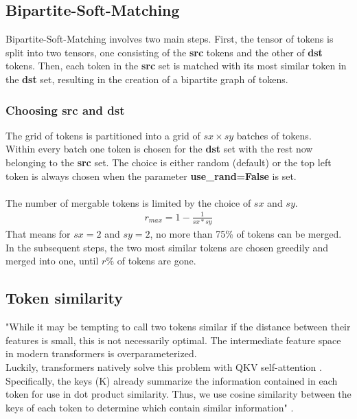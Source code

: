 \subsection{Bipartite-Soft-Matching}
Bipartite-Soft-Matching involves two main steps. First, the tensor of tokens is split into two tensors, one consisting of the \textbf{src} tokens and the other of \textbf{dst} tokens. Then, each token in the \textbf{src} set is matched with its most similar token in the \textbf{dst} set, resulting in the creation of a bipartite graph of tokens. 

\subsubsection*{Choosing src and dst}
The grid of tokens is partitioned into a grid of \(sx \times sy\) batches of tokens.\\
Within every batch one token is chosen for the \textbf{dst} set with the rest now belonging to the \textbf{src} set. The choice is either random (default) or the top left token is always chosen when the parameter \textbf{use\_rand=False} is set.\\
\\
The number of mergable tokens is limited by the choice of \(sx\) and \(sy\).
\begin{align*}
    r_{max} = 1-\frac{1}{sx*sy}
\end{align*}
That means for \(sx = 2\) and \(sy = 2\), no more than 75\% of tokens can be merged.\\
In the subsequent steps, the two most similar tokens are chosen greedily and merged into one, until \(r\%\) of tokens are gone.

\subsection{Token similarity}
"While it may be tempting to call two tokens similar if the distance between their features is small, this is not necessarily optimal. The intermediate feature space in modern transformers is overparameterized.\\ 
Luckily, transformers natively solve this problem with QKV self-attention \cite{vaswani2017attention}.
Specifically, the keys (K) already summarize the information contained in each token for use in dot product similarity. Thus, we use cosine similarity between the keys of each token to determine which contain similar information" \cite{bolya2023tome}.

\newpage
